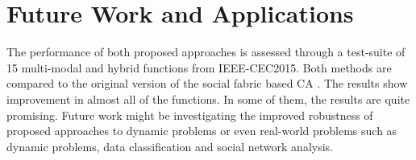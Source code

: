 \section{Future Work and Applications}

The performance of both proposed approaches is assessed through a test-suite of 15 multi-modal and hybrid functions from IEEE-CEC2015. Both methods are compared to the original version of the social fabric based CA \citet{ali2016leveraged}. The results show improvement in almost all of the functions. In some of them, the results are quite promising. Future work might be investigating the improved robustness of proposed approaches to dynamic problems or even real-world problems such as dynamic problems, data classification and social network analysis.




